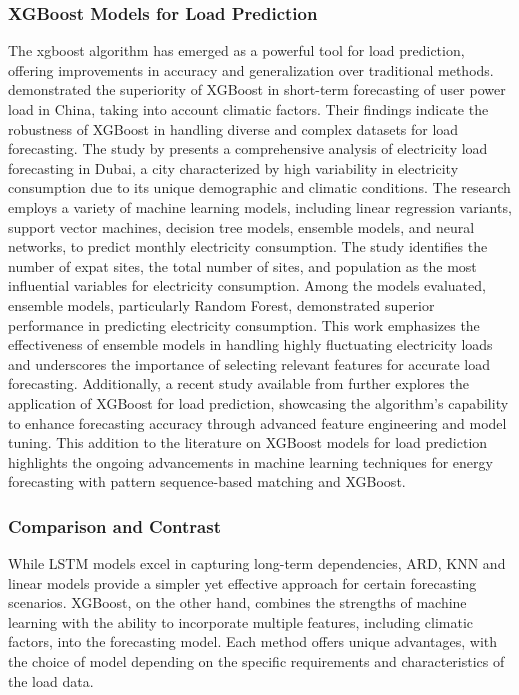 \documentclass{article} %
\begin{document}
\subsubsection{XGBoost Models for Load Prediction}
The \gls*{xgboost} algorithm has emerged as a powerful tool for load prediction, offering improvements in accuracy and generalization over traditional methods. \cite{cai2020short} demonstrated the superiority of XGBoost in short-term forecasting of user power load in China, taking into account climatic factors. Their findings indicate the robustness of XGBoost in handling diverse and complex datasets for load forecasting. The study by \citet{ABDALLAH2022101707} presents a comprehensive analysis of electricity load forecasting in Dubai, a city characterized by high variability in electricity consumption due to its unique demographic and climatic conditions. The research employs a variety of machine learning models, including linear regression variants, support vector machines, decision tree models, ensemble models, and neural networks, to predict monthly electricity consumption. The study identifies the number of expat sites, the total number of sites, and population as the most influential variables for electricity consumption. Among the models evaluated, ensemble models, particularly Random Forest, demonstrated superior performance in predicting electricity consumption. This work emphasizes the effectiveness of ensemble models in handling highly fluctuating electricity loads and underscores the importance of selecting relevant features for accurate load forecasting. Additionally, a recent study available from \cite{NIE2022117854} further explores the application of XGBoost for load prediction, showcasing the algorithm's capability to enhance forecasting accuracy through advanced feature engineering and model tuning. This addition to the literature on XGBoost models for load prediction highlights the ongoing advancements in machine learning techniques for energy forecasting with pattern sequence-based matching and XGBoost.



\subsubsection{Comparison and Contrast}
While LSTM models excel in capturing long-term dependencies, ARD, KNN and linear models provide a simpler yet effective approach for certain forecasting scenarios. XGBoost, on the other hand, combines the strengths of machine learning with the ability to incorporate multiple features, including climatic factors, into the forecasting model. Each method offers unique advantages, with the choice of model depending on the specific requirements and characteristics of the load data.
\end{document}
